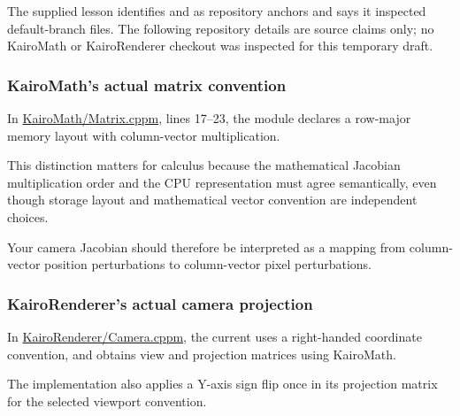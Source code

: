 The supplied lesson identifies  and  as repository anchors and says it inspected default-branch files. The following repository details are source claims only; no KairoMath or KairoRenderer checkout was inspected for this temporary draft.

\subsubsection{KairoMath's actual matrix convention}\label{02-foundations-ii-ch021-kairomaths-actual-matrix-convention}

\hypertarget{02-foundations-ii-ch021-kairomaths-actual-matrix-convention}{}

In \href{https://github.com/swayam8624/KairoMath/blob/master/Matrix.cppm?utm_source=chatgpt.com}{KairoMath/Matrix.cppm}, lines 17--23, the module declares a row-major memory layout with column-vector multiplication.

This distinction matters for calculus because the mathematical Jacobian multiplication order and the CPU representation must agree semantically, even though storage layout and mathematical vector convention are independent choices.

Your camera Jacobian should therefore be interpreted as a mapping from column-vector position perturbations to column-vector pixel perturbations.

\subsubsection{KairoRenderer's actual camera projection}\label{02-foundations-ii-ch021-kairorenderers-actual-camera-projection}

\hypertarget{02-foundations-ii-ch021-kairorenderers-actual-camera-projection}{}

In \href{https://github.com/swayam8624/KairoRenderer/blob/main/Camera.cppm?utm_source=chatgpt.com}{KairoRenderer/Camera.cppm}, the current  uses a right-handed coordinate convention, and  obtains view and projection matrices using KairoMath.

The implementation also applies a Y-axis sign flip once in its projection matrix for the selected viewport convention.

